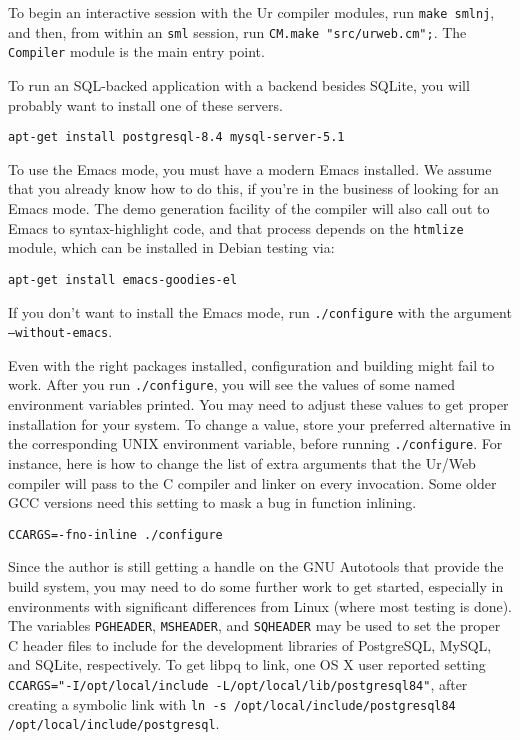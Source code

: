 \documentclass{article}
\begin{document}
To begin an interactive session with the Ur compiler modules, run \texttt{make smlnj}, and then, from within an \texttt{sml} session, run \texttt{CM.make "src/urweb.cm";}.  The \texttt{Compiler} module is the main entry point.

To run an SQL-backed application with a backend besides SQLite, you will probably want to install one of these servers.

\begin{verbatim}
apt-get install postgresql-8.4 mysql-server-5.1
\end{verbatim}

To use the Emacs mode, you must have a modern Emacs installed.  We assume that you already know how to do this, if you're in the business of looking for an Emacs mode.  The demo generation facility of the compiler will also call out to Emacs to syntax-highlight code, and that process depends on the \texttt{htmlize} module, which can be installed in Debian testing via:

\begin{verbatim}
apt-get install emacs-goodies-el
\end{verbatim}

If you don't want to install the Emacs mode, run \texttt{./configure} with the argument \texttt{--without-emacs}.

Even with the right packages installed, configuration and building might fail to work.  After you run \texttt{./configure}, you will see the values of some named environment variables printed.  You may need to adjust these values to get proper installation for your system.  To change a value, store your preferred alternative in the corresponding UNIX environment variable, before running \texttt{./configure}.  For instance, here is how to change the list of extra arguments that the Ur/Web compiler will pass to the C compiler and linker on every invocation.  Some older GCC versions need this setting to mask a bug in function inlining.

\begin{verbatim}
CCARGS=-fno-inline ./configure
\end{verbatim}

Since the author is still getting a handle on the GNU Autotools that provide the build system, you may need to do some further work to get started, especially in environments with significant differences from Linux (where most testing is done).  The variables \texttt{PGHEADER}, \texttt{MSHEADER}, and \texttt{SQHEADER} may be used to set the proper C header files to include for the development libraries of PostgreSQL, MySQL, and SQLite, respectively.  To get libpq to link, one OS X user reported setting \texttt{CCARGS="-I/opt/local/include -L/opt/local/lib/postgresql84"}, after creating a symbolic link with \texttt{ln -s /opt/local/include/postgresql84 /opt/local/include/postgresql}.
\end{document}
